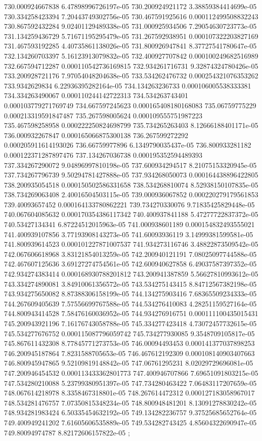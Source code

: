 {730.000924667838 6.47898996726197e-05
730.200924921172 3.38859384414699e-05
730.334258423394 7.20443749302756e-05
730.467591925616 0.000112499508832243
730.867592432284 9.02401129489338e-05
731.000925934506 7.29054630723773e-05
731.134259436729 5.71671195295479e-05
731.267592938951 0.000107322203827169
731.467593192285 4.40735861138026e-05
731.800926947841 8.37727541780647e-05
732.134260703397 5.16123913079832e-05
732.400927707842 0.000100249682516989
732.667594712287 0.000110542736169815
732.934261716731 9.32874324780426e-05
733.200928721176 7.97054048204638e-05
733.534262476732 0.000254321076353262
733.9342629834 6.22936395282164e-05
734.134263236733 0.000106005538333381
734.334263490067 0.000110244142722313
734.534263743401 0.000103779271769749
734.667597245623 0.000165408180168083
735.06759775229 0.000213319591847487
735.267598005624 0.000109555751987223
735.467598258958 0.000222250824698799
735.734265263403 8.12666188401171e-05
736.000932267847 0.000165066875300138
736.267599272292 0.000205911614193026
736.66759977896 6.1349790035437e-05
736.800933281182 0.000122371287897476
737.134267036738 0.000195352594489393
737.334267290072 9.04896997810198e-05
737.600934294517 8.21075153320945e-05
737.734267796739 9.50294781427888e-05
737.934268050073 0.000164438896422805
738.200935054518 0.000150502586331658
738.534268810074 8.52938150107835e-05
738.734269063408 2.40016504503115e-05
739.000936067852 0.000220279179561853
739.40093657452 0.000164133780862221
739.734270330076 9.71835425829448e-05
740.067604085632 0.000170354386117342
740.400937841188 5.47277722837372e-05
740.53427134341 6.87224512015963e-05
741.000938601189 0.000154832493555021
741.400939107856 3.77193908143273e-05
741.60093936119 3.14999381599581e-05
741.800939614523 0.000101227871007537
741.934273116746 3.48822873509542e-05
742.067606618968 3.83121854013259e-05
742.200940121191 7.08025097744588e-05
742.467607125636 3.69127274754561e-05
742.600940627858 6.49037587397352e-05
742.934274383414 0.000168930788201812
743.200941387859 5.56627810993612e-05
743.334274890081 3.84910061356572e-05
743.534275143415 8.84712567382198e-05
743.934275650082 8.87388306158199e-05
744.134275903416 7.68365509234333e-05
744.267609405639 7.57556699767588e-05
744.534276410083 4.28251159527164e-05
744.800943414528 7.58476160036952e-05
744.934276916751 0.000111100435015431
745.200943921196 7.16176743058788e-05
745.334277423418 4.73072457732615e-05
745.534277676752 0.000115087796059742
745.734277930085 9.3548709105817e-05
745.867611432308 8.77845771273753e-05
746.00094493453 0.000141377037898253
746.200945187864 7.8231588705653e-05
746.467612192309 0.000108140903407663
746.800945947865 9.52109819148842e-05
747.06761295231 8.02029729696081e-05
747.200946454532 0.000113433362801773
747.400946707866 7.69651091803215e-05
747.534280210088 5.23799380951397e-05
747.734280463422 7.06483117207659e-05
748.067614218978 8.3358467318801e-05
748.267614472312 0.000127183058967017
748.534281476757 7.07350815348234e-05
748.800948481201 8.13091278830242e-05
748.934281983424 6.50335454632192e-05
749.134282236757 9.37525685652764e-05
749.400949241202 7.61605606535889e-05
749.534282743425 4.85604322690947e-05
749.80094974787 8.82172606157822e-05
};